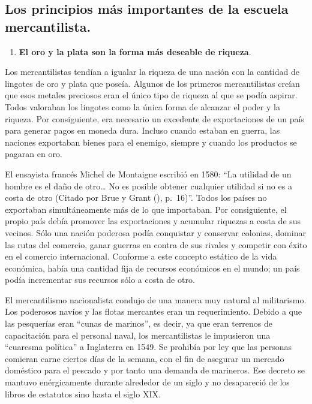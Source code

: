 \documentclass[
  jou,
  floatsintext,
  longtable,
  a4paper,
  nolmodern,
  notxfonts,
  notimes,
  colorlinks=true,linkcolor=blue,citecolor=blue,urlcolor=blue]{apa7}
\providecommand{\tightlist}{%
  \setlength{\itemsep}{0pt}\setlength{\parskip}{0pt}}
\begin{document}
\subsection{Los principios más importantes de la escuela
mercantilista.}\label{los-principios-muxe1s-importantes-de-la-escuela-mercantilista.}

\begin{enumerate}
\def\labelenumi{\arabic{enumi}.}
\tightlist
\item
  \hspace{0pt} \textbf{El oro y la plata son la forma más deseable de
  riqueza}.
\end{enumerate}

Los mercantilistas tendían a igualar la riqueza de una nación con la
cantidad de lingotes de oro y plata que poseía. Algunos de los primeros
mercantilistas creían que esos metales preciosos eran el único tipo de
riqueza al que se podía aspirar. Todos valoraban los lingotes como la
única forma de alcanzar el poder y la riqueza. Por consiguiente, era
necesario un excedente de exportaciones de un país para generar pagos en
moneda dura. Incluso cuando estaban en guerra, las naciones exportaban
bienes para el enemigo, siempre y cuando los productos se pagaran en
oro.

El ensayista francés Michel de Montaigne escribió en 1580: ``La utilidad
de un hombre es el daño de otro\ldots{} No es posible obtener cualquier
utilidad si no es a costa de otro (Citado por Brue y Grant
(), p.~16)''.
Todos los países no exportaban simultáneamente más de lo que importaban.
Por consiguiente, el propio país debía promover las exportaciones y
acumular riquezas a costa de sus vecinos. Sólo una nación poderosa podía
conquistar y conservar colonias, dominar las rutas del comercio, ganar
guerras en contra de sus rivales y competir con éxito en el comercio
internacional. Conforme a este concepto estático de la vida económica,
había una cantidad fija de recursos económicos en el mundo; un país
podía incrementar sus recursos sólo a costa de otro.

El mercantilismo nacionalista condujo de una manera muy natural al
militarismo. Los poderosos navíos y las flotas mercantes eran un
requerimiento. Debido a que las pesquerías eran ``cunas de marinos'', es
decir, ya que eran terrenos de capacitación para el personal naval, los
mercantilistas le impusieron una ``cuaresma política'' a Inglaterra en
1549. Se prohibía por ley que las personas comieran carne ciertos días
de la semana, con el fin de asegurar un mercado doméstico para el
pescado y por tanto una demanda de marineros. Ese decreto se mantuvo
enérgicamente durante alrededor de un siglo y no desapareció de los
libros de estatutos sino hasta el siglo XIX.
\end{document}
